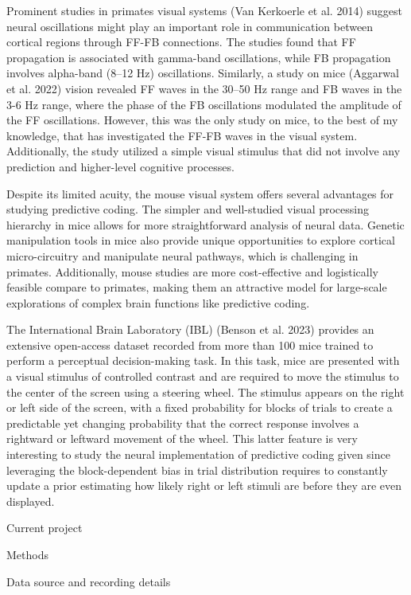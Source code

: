 \documentclass[
  letterpaper,
  DIV=11,
  numbers=noendperiod]{scrartcl}
\begin{document}
Prominent studies in primates visual systems (Van Kerkoerle et al. 2014)
suggest neural oscillations might play an important role in
communication between cortical regions through FF-FB connections. The
studies found that FF propagation is associated with gamma-band
oscillations, while FB propagation involves alpha-band (8--12 Hz)
oscillations. Similarly, a study on mice (Aggarwal et al. 2022) vision
revealed FF waves in the 30--50 Hz range and FB waves in the 3-6 Hz
range, where the phase of the FB oscillations modulated the amplitude of
the FF oscillations. However, this was the only study on mice, to the
best of my knowledge, that has investigated the FF-FB waves in the
visual system. Additionally, the study utilized a simple visual stimulus
that did not involve any prediction and higher-level cognitive
processes.

Despite its limited acuity, the mouse visual system offers several
advantages for studying predictive coding. The simpler and well-studied
visual processing hierarchy in mice allows for more straightforward
analysis of neural data. Genetic manipulation tools in mice also provide
unique opportunities to explore cortical micro-circuitry and manipulate
neural pathways, which is challenging in primates. Additionally, mouse
studies are more cost-effective and logistically feasible compare to
primates, making them an attractive model for large-scale explorations
of complex brain functions like predictive coding.

The International Brain Laboratory (IBL) (Benson et al. 2023) provides
an extensive open-access dataset recorded from more than 100 mice
trained to perform a perceptual decision-making task. In this task, mice
are presented with a visual stimulus of controlled contrast and are
required to move the stimulus to the center of the screen using a
steering wheel. The stimulus appears on the right or left side of the
screen, with a fixed probability for blocks of trials to create a
predictable yet changing probability that the correct response involves
a rightward or leftward movement of the wheel. This latter feature is
very interesting to study the neural implementation of predictive coding
given since leveraging the block-dependent bias in trial distribution
requires to constantly update a prior estimating how likely right or
left stimuli are before they are even displayed.

Current project

Methods

Data source and recording details
\end{document}
